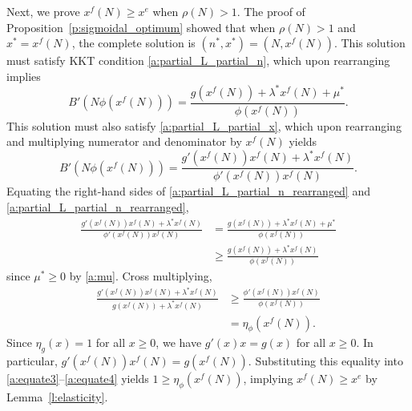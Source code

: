 \documentclass[12pt]{article}
\newcommand{\efficacy}{\phi}
\newcommand{\general}{g}
\newcommand{\benefit}{B}
\newcommand{\ratio}{\rho(N)}
\newcommand{\xfull}{x^{f\!}}
\newcommand{\xunit}{x^{e}}
\newcommand{\elasticity}[1]{\eta_{#1}}
\begin{document}
Next, we prove $\xfull(N) \geq \xunit$ when $\ratio > 1$. The proof of Proposition~\ref{p:sigmoidal_optimum} showed that when $\ratio > 1$ and $x^* = \xfull(N)$, the complete solution is $(n^*, x^*) = (N, \xfull(N))$. This solution must satisfy KKT condition \eqref{a:partial_L_partial_n}, which upon rearranging implies
\begin{equation}
\label{a:partial_L_partial_n_rearranged}
\benefit'(N \efficacy(\xfull(N))) = \frac{\general(\xfull(N)) + \lambda^* \xfull(N) + \mu^*}{\efficacy(\xfull(N))}.
\end{equation}
This solution must also satisfy \eqref{a:partial_L_partial_x}, which upon rearranging and multiplying numerator and denominator by $\xfull(N)$ yields 
\begin{equation}
\label{a:partial_L_partial_x_rearranged}
\benefit'(N \efficacy(\xfull(N))) = \frac{\general'(\xfull(N))\xfull(N) + \lambda^* \xfull(N)}{\efficacy'(\xfull(N)) \xfull(N)}.
\end{equation}
Equating the right-hand sides of \eqref{a:partial_L_partial_n_rearranged} and  \eqref{a:partial_L_partial_n_rearranged},
\begin{align}
\frac{\general'(\xfull(N))\xfull(N) + \lambda^* \xfull(N)}{\efficacy'(\xfull(N)) \xfull(N)} & = \frac{\general(\xfull(N)) + \lambda^* \xfull(N) + \mu^*}{\efficacy(\xfull(N))} \label{a:equate1} \\
& \geq \frac{\general(\xfull(N)) + \lambda^* \xfull(N)}{\efficacy(\xfull(N))} \label{a:equate2}
\end{align}
since $\mu^* \geq 0$ by \eqref{a:mu}. Cross multiplying,
\begin{align} 
\frac{\general'(\xfull(N))\xfull(N) + \lambda^* \xfull(N)}{\general(\xfull(N)) + \lambda^* \xfull(N)} & \geq \frac{\efficacy'(\xfull(N)) \xfull(N)}{\efficacy(\xfull(N))}  \label{a:equate3} \\
& = \elasticity{\efficacy}(\xfull(N)). \label{a:equate4}
\end{align}
Since $\elasticity{\general}(x) = 1$ for all $x \geq 0$, we have $\general'(x) x = \general(x)$ for all $x \geq 0$. In particular, $\general'(\xfull(N)) \xfull(N) = \general(\xfull(N))$. Substituting this equality into \eqref{a:equate3}--\eqref{a:equate4}  yields $1 \geq \elasticity{\efficacy}(\xfull(N))$, implying $ \xfull(N) \geq \xunit$ by Lemma~\ref{l:elasticity}.
\end{document}
